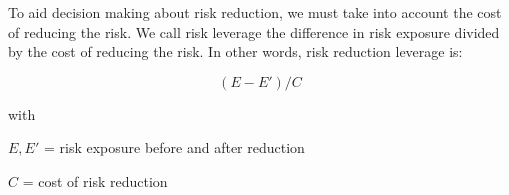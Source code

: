 To aid decision making about risk reduction, we must take into account the cost of reducing
the risk. We call risk leverage the difference in risk exposure divided by the cost of reducing
the risk. In other words, risk reduction leverage is:

$$
    (E - E')/C
$$

with

$E, E'$ = risk exposure before and after reduction

$C$ = cost of risk reduction
